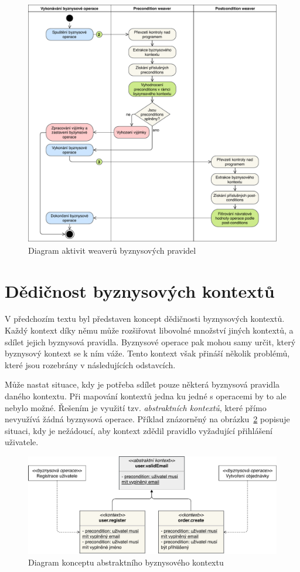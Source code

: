 \begin{figure}
    \centering
    \includegraphics[keepaspectratio=true, width=0.8\linewidth]{figures/business-rules-weaver.pdf}
    \caption{Diagram aktivit weaverů byznysov\'ych pravidel}
    \label{fig:business-rules-weaver}
\end{figure}

\section{Dědičnost byznysových kontextů}\label{sec:context-inheritance}

V předchozím textu byl představen koncept dědičnosti byznysových kontextů.
Každý kontext díky němu může rozšiřovat libovolné množství jiných kontextů, a sdílet jejich
byznysová pravidla. Byznysové operace pak mohou samy určit, který byznysový kontext se k ním váže.
Tento kontext však přináší několik problémů, které jsou rozebrány v následujících odstavcích.

Může nastat situace, kdy je potřeba sdílet pouze některá byznysová pravidla
daného kontextu. Při mapování kontextů jedna ku jedné s operacemi by to ale
nebylo možné. Řešením je využití tzv. \textit{abstraktních kontextů},
které přímo nevyužívá žádná byznysová operace.
Příklad znázorněný na obrázku~\ref{fig:abstract-context} popisuje situaci, kdy je nežádoucí,
aby kontext  zdědil pravidlo vyžadující přihlášení uživatele.

\begin{figure}
    \centering
    \includegraphics[keepaspectratio=true, width=1\linewidth]{figures/abstract-context.pdf}
    \caption{Diagram konceptu abstraktního byznysového kontextu}
    \label{fig:abstract-context}
\end{figure}

